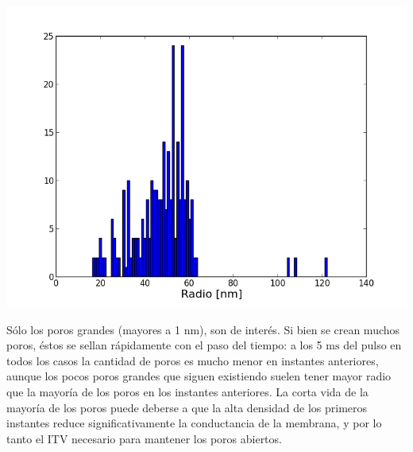 \documentclass[a0,portrait]{a0poster}
\begin{document}
\begin{multicols}{2}
\begin{multicols}{2}
	\begin{center}\vspace{1cm}
	\includegraphics[width=1\linewidth]{hist-radios-5e-3-50-64-160KVm}
	\end{center}\vspace{1cm}
\end{multicols}

Sólo los poros grandes (mayores a 1 $\si{\nano\metre}$), son de interés. Si bien se crean muchos poros, éstos se sellan rápidamente con el paso del tiempo: a los 5 $\si{\milli\second}$ del pulso en todos los casos la cantidad de poros es mucho menor en instantes anteriores, aunque los pocos poros grandes que siguen existiendo suelen tener mayor radio que la mayoría de los poros en los instantes anteriores. La corta vida de la mayoría de los poros puede deberse a que la alta densidad de los primeros instantes reduce significativamente la conductancia de la membrana, y por lo tanto el ITV necesario para mantener los poros abiertos.



\end{multicols}
\end{document}
